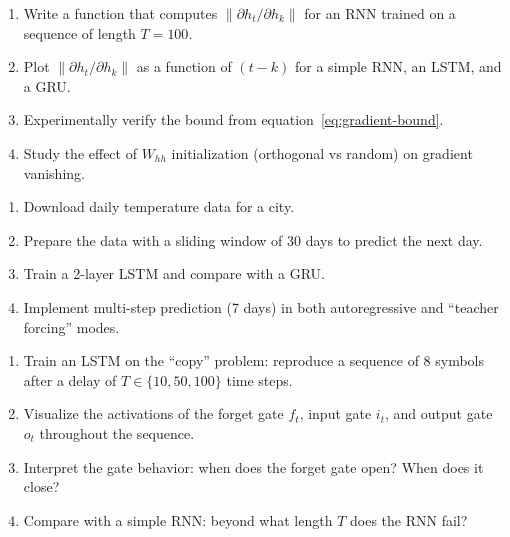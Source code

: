 \begin{exercise}
\begin{enumerate}
  \item Write a function that computes
    $\|\partial h_t / \partial h_k\|$ for an RNN trained on a sequence
    of length $T = 100$.
  \item Plot $\|\partial h_t / \partial h_k\|$ as a function of $(t - k)$
    for a simple RNN, an LSTM, and a GRU.
  \item Experimentally verify the bound from equation~\ref{eq:gradient-bound}.
  \item Study the effect of $W_{hh}$ initialization (orthogonal vs
    random) on gradient vanishing.
\end{enumerate}
\end{exercise}

\begin{exercise}
\begin{enumerate}
  \item Download daily temperature data for a city.
  \item Prepare the data with a sliding window of 30 days to predict the
    next day.
  \item Train a 2-layer LSTM and compare with a GRU.
  \item Implement multi-step prediction (7 days) in both autoregressive
    and ``teacher forcing'' modes.
\end{enumerate}
\end{exercise}

\begin{exercise}
\begin{enumerate}
  \item Train an LSTM on the ``copy'' problem: reproduce a sequence of
    8 symbols after a delay of $T \in \{10, 50, 100\}$ time steps.
  \item Visualize the activations of the forget gate $f_t$, input gate $i_t$,
    and output gate $o_t$ throughout the sequence.
  \item Interpret the gate behavior: when does the forget gate open?
    When does it close?
  \item Compare with a simple RNN: beyond what length $T$ does the RNN fail?
\end{enumerate}
\end{exercise}

